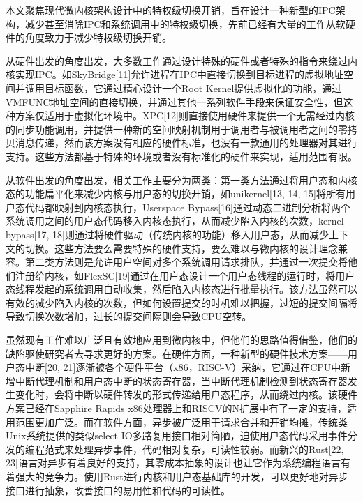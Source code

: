 本文聚焦现代微内核架构设计中的特权级切换开销，旨在设计一种新型的IPC架构，减少甚至消除IPC和系统调用中的特权级切换，先前已经有大量的工作从软硬件的角度致力于减少特权级切换开销。

从硬件出发的角度出发，大多数工作通过设计特殊的硬件或者特殊的指令来绕过内核实现IPC。如SkyBridge[11]允许进程在IPC中直接切换到目标进程的虚拟地址空间并调用目标函数，它通过精心设计一个Root Kernel提供虚拟化的功能，通过VMFUNC地址空间的直接切换，并通过其他一系列软件手段来保证安全性，但这种方案仅适用于虚拟化环境中。XPC[12]则直接使用硬件来提供一个无需经过内核的同步功能调用，并提供一种新的空间映射机制用于调用者与被调用者之间的零拷贝消息传递，然而该方案没有相应的硬件标准，也没有一款通用的处理器对其进行支持。这些方法都基于特殊的环境或者没有标准化的硬件来实现，适用范围有限。

从软件出发的角度出发，相关工作主要分为两类：第一类方法通过将用户态和内核态的功能扁平化来减少内核与用户态的切换开销，如unikernel[13, 14, 15]将所有用户态代码都映射到内核态执行，Userspace Bypass[16]通过动态二进制分析将两个系统调用之间的用户态代码移入内核态执行，从而减少陷入内核的次数，kernel bypass[17, 18]则通过将硬件驱动（传统内核的功能）移入用户态，从而减少上下文的切换。这些方法要么需要特殊的硬件支持，要么难以与微内核的设计理念兼容。第二类方法则是允许用户空间对多个系统调用请求排队，并通过一次提交将他们注册给内核，如FlexSC[19]通过在用户态设计一个用户态线程的运行时，将用户态线程发起的系统调用自动收集，然后陷入内核态进行批量执行。该方法虽然可以有效的减少陷入内核的次数，但如何设置提交的时机难以把握，过短的提交间隔将导致切换次数增加，过长的提交间隔则会导致CPU空转。

虽然现有工作难以广泛且有效地应用到微内核中，但他们的思路值得借鉴，他们的缺陷驱使研究者去寻求更好的方案。在硬件方面，一种新型的硬件技术方案——用户态中断[20, 21]逐渐被各个硬件平台（x86，RISC-V）采纳，它通过在CPU中新增中断代理机制和用户态中断的状态寄存器，当中断代理机制检测到状态寄存器发生变化时，会将中断以硬件转发的形式传递给用户态程序，从而绕过内核。该硬件方案已经在Sapphire Rapids x86处理器上和RISCV的N扩展中有了一定的支持，适用范围更加广泛。而在软件方面，异步被广泛用于请求合并和开销均摊，传统类Unix系统提供的类似select IO多路复用接口相对简陋，迫使用户态代码采用事件分发的编程范式来处理异步事件，代码相对复杂，可读性较弱。而新兴的Rust[22, 23]语言对异步有着良好的支持，其零成本抽象的设计也让它作为系统编程语言有着强大的竞争力。使用Rust进行内核和用户态基础库的开发，可以更好地对异步接口进行抽象，改善接口的易用性和代码的可读性。

